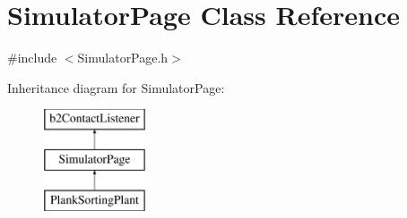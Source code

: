 \hypertarget{classSimulatorPage}{\section{Simulator\-Page Class Reference}
\label{classSimulatorPage}
}


{\ttfamily \#include $<$Simulator\-Page.\-h$>$}

Inheritance diagram for Simulator\-Page\-:\begin{figure}[H]
\begin{center}
\leavevmode
\includegraphics[height=3.000000cm]{classSimulatorPage}
\end{center}
\end{figure}
